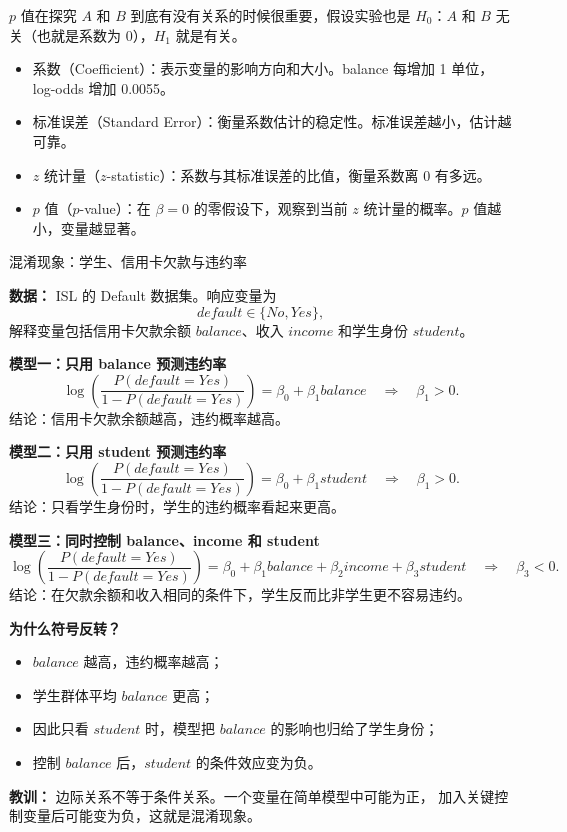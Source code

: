 \begin{dxtips}
    $p$ 值在探究 $A$ 和 $B$ 到底有没有关系的时候很重要，假设实验也是 $H_0$：$A$ 和 $B$ 无关（也就是系数为 $0$），$H_1$ 就是有关。
\end{dxtips}
\begin{itemize}
  \item 系数（Coefficient）：表示变量的影响方向和大小。balance 每增加 1 单位，log-odds 增加 0.0055。
  \item 标准误差（Standard Error）：衡量系数估计的稳定性。标准误差越小，估计越可靠。
  \item $z$ 统计量（$z$-statistic）：系数与其标准误差的比值，衡量系数离 0 有多远。
  \item $p$ 值（$p$-value）：在 $\beta=0$ 的零假设下，观察到当前 $z$ 统计量的概率。$p$ 值越小，变量越显著。
\end{itemize}
\begin{example}{混淆现象：学生、信用卡欠款与违约率}

\textbf{数据：} ISL 的 Default 数据集。响应变量为
\[
default \in \{No, Yes\},
\]
解释变量包括信用卡欠款余额 \(balance\)、收入 \(income\) 和学生身份 \(student\)。

\vspace{0.3em}

\textbf{模型一：只用 balance 预测违约率}
\[
\log\left(\frac{P(default=Yes)}{1-P(default=Yes)}\right)
=
\beta_0+\beta_1 balance
\quad\Rightarrow\quad \beta_1>0.
\]
结论：信用卡欠款余额越高，违约概率越高。

\vspace{0.3em}

\textbf{模型二：只用 student 预测违约率}
\[
\log\left(\frac{P(default=Yes)}{1-P(default=Yes)}\right)
=
\beta_0+\beta_1 student
\quad\Rightarrow\quad \beta_1>0.
\]
结论：只看学生身份时，学生的违约概率看起来更高。

\vspace{0.3em}

\textbf{模型三：同时控制 balance、income 和 student}
\[
\log\left(\frac{P(default=Yes)}{1-P(default=Yes)}\right)
=
\beta_0+\beta_1 balance+\beta_2 income+\beta_3 student
\quad\Rightarrow\quad \beta_3<0.
\]
结论：在欠款余额和收入相同的条件下，学生反而比非学生更不容易违约。

\vspace{0.3em}

\textbf{为什么符号反转？}
\begin{itemize}
    \item \(balance\) 越高，违约概率越高；
    \item 学生群体平均 \(balance\) 更高；
    \item 因此只看 \(student\) 时，模型把 \(balance\) 的影响也归给了学生身份；
    \item 控制 \(balance\) 后，\(student\) 的条件效应变为负。
\end{itemize}

\vspace{0.3em}

\textbf{教训：} 边际关系不等于条件关系。一个变量在简单模型中可能为正，
加入关键控制变量后可能变为负，这就是混淆现象。

\end{example}
